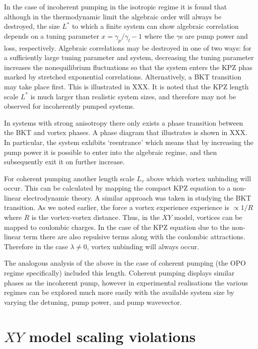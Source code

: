 \documentclass[letterpaper, 10 pt, conference]{IEEEtran}  %
\begin{document}
In the case of incoherent pumping in the isotropic regime it is found that although in the thermodynamic limit the algebraic order will always be destroyed, the size $L^*$ to which a finite system can show algebraic correlation depends on a tuning parameter $x= \gamma_p / \gamma_l -1$ where the $\gamma$s are pump power and loss, respectively. 
Algebraic correlations may be destroyed in one of two ways: for a sufficiently large tuning parameter and system, decreasing the tuning parameter increases the nonequilibrium fluctuations so that the system enters the KPZ phas marked by stretched exponential correlations. 
Alternatively, a BKT transition may take place first. 
This is illustrated in XXX. 
It is noted that the KPZ length scale $L^*$ is much larger than realistic system sizes, and therefore may not be observed for incoherently pumped systems. 

In systems with strong anisotropy there only exists a phase transition between the BKT and vortex phases.
A phase diagram that illustrates is shown in XXX.
In particular, the system exhibits `reentrance' which means that by increasing the pump power it is possible to enter into the algebraic regime, and then subsequently exit it on further increase.

For coherent pumping another length scale $L_v$ above which vortex unbinding will occur. 
This can be calculated by mapping the compact KPZ equation to a non-linear electrodynamic theory.
A similar approach was taken in studying the BKT transition. 
As we noted earlier, the force a vortex experience experience is $\propto 1/R$ where $R$ is the vortex-vortex distance. 
Thus, in the $XY$ model, vortices can be mapped to coulombic charges. 
In the case of the KPZ equation due to the non-linear term there are also repulsive terms along with the coulombic attractions. 
Therefore in the case $\lambda \neq 0$, vortex unbinding will always occur. 

The analogous analysis of the above in the case of coherent pumping (the OPO regime specifically) included this length.
Coherent pumping displays similar phases as the incoherent pump, however in experimental realisations the various regimes can be explored much more easily with the available system size by varying the detuning, pump power, and pump wavevector. 

\section{$XY$ model scaling violations}
\end{document}
